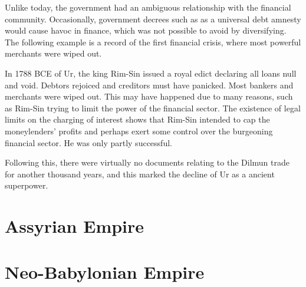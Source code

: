 \documentclass{article}
\begin{document}
    Unlike today, the government had an ambiguous relationship with the financial community. Occasionally, government decrees such as as a universal debt amnesty would cause havoc in finance, which was not possible to avoid by diversifying. The following example is a record of the first financial crisis, where most powerful merchants were wiped out. 

    \begin{example}
      \label{ex:rim-sin}
      In 1788 BCE of Ur, the king Rim-Sin issued a royal edict declaring all loans null and void. Debtors rejoiced and creditors must have panicked. Most bankers and merchants were wiped out. This may have happened due to many reasons, such as Rim-Sin trying to limit the power of the financial sector. The existence of legal limits on the charging of interest shows that Rim-Sin intended to cap the moneylenders’ profits and perhaps exert some control over the burgeoning financial sector. He was only partly successful.

      Following this, there were virtually no documents relating to the Dilmun trade for another thousand years, and this marked the decline of Ur as a ancient superpower. 
    \end{example}

\section{Assyrian Empire}

\section{Neo-Babylonian Empire}
\end{document}
